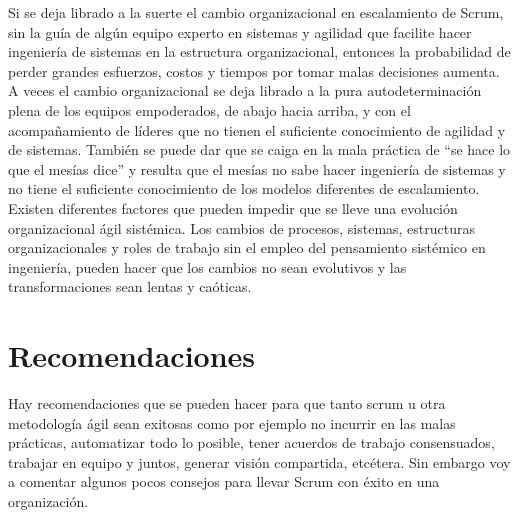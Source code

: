 \begin{enumerate}
Si se deja librado a la suerte el cambio organizacional en escalamiento de Scrum, sin la guía de algún equipo experto en sistemas y agilidad que facilite hacer ingeniería de sistemas en la estructura organizacional, entonces la probabilidad de perder grandes esfuerzos, costos y tiempos por tomar malas decisiones aumenta. A veces el cambio organizacional se deja librado a la pura autodeterminación plena de los equipos empoderados, de abajo hacia arriba, y con el acompañamiento de líderes que no tienen el suficiente conocimiento de agilidad y de sistemas. También se puede dar que se caiga en la mala práctica de “se hace lo que el mesías dice” y resulta que el mesías no sabe hacer ingeniería de sistemas y no tiene el suficiente conocimiento de los modelos diferentes de escalamiento. Existen diferentes factores que pueden impedir que se lleve una evolución organizacional ágil sistémica. Los cambios de procesos, sistemas, estructuras organizacionales y roles de trabajo sin el empleo del pensamiento sistémico en ingeniería, pueden hacer que los cambios no sean evolutivos y las transformaciones sean lentas y caóticas. 

\end{enumerate}



\section{Recomendaciones}

Hay recomendaciones que se pueden hacer para que tanto scrum u otra metodología ágil sean exitosas como por ejemplo no incurrir en las malas prácticas, automatizar todo lo posible, tener acuerdos de trabajo consensuados, trabajar en equipo y juntos, generar visión compartida, etcétera. Sin embargo voy a comentar algunos pocos consejos para llevar Scrum con éxito en una organización.

